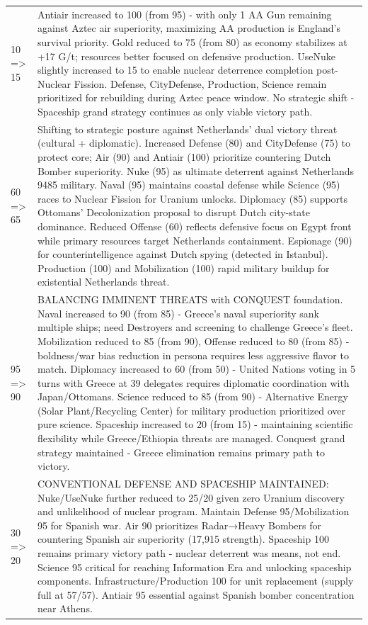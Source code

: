 \begin{longtable}{p{}p{}}
10 => 15 & Antiair increased to 100 (from 95) - with only 1 AA Gun remaining against Aztec air superiority, maximizing AA production is England's survival priority. Gold reduced to 75 (from 80) as economy stabilizes at +17 G/t; resources better focused on defensive production. UseNuke slightly increased to 15 to enable nuclear deterrence completion post-Nuclear Fission. Defense, CityDefense, Production, Science remain prioritized for rebuilding during Aztec peace window. No strategic shift - Spaceship grand strategy continues as only viable victory path. \\
60 => 65 & Shifting to strategic posture against Netherlands' dual victory threat (cultural + diplomatic). Increased Defense (80) and CityDefense (75) to protect core; Air (90) and Antiair (100) prioritize countering Dutch Bomber superiority. Nuke (95) as ultimate deterrent against Netherlands 9485 military. Naval (95) maintains coastal defense while Science (95) races to Nuclear Fission for Uranium unlocks. Diplomacy (85) supports Ottomans' Decolonization proposal to disrupt Dutch city-state dominance. Reduced Offense (60) reflects defensive focus on Egypt front while primary resources target Netherlands containment. Espionage (90) for counterintelligence against Dutch spying (detected in Istanbul). Production (100) and Mobilization (100) rapid military buildup for existential Netherlands threat. \\
95 => 90 & BALANCING IMMINENT THREATS with CONQUEST foundation. Naval increased to 90 (from 85) - Greece's naval superiority sank multiple ships; need Destroyers and screening to challenge Greece's fleet. Mobilization reduced to 85 (from 90), Offense reduced to 80 (from 85) - boldness/war bias reduction in persona requires less aggressive flavor to match. Diplomacy increased to 60 (from 50) - United Nations voting in 5 turns with Greece at 39 delegates requires diplomatic coordination with Japan/Ottomans. Science reduced to 85 (from 90) - Alternative Energy (Solar Plant/Recycling Center) for military production prioritized over pure science. Spaceship increased to 20 (from 15) - maintaining scientific flexibility while Greece/Ethiopia threats are managed. Conquest grand strategy maintained - Greece elimination remains primary path to victory. \\
30 => 20 & CONVENTIONAL DEFENSE AND SPACESHIP MAINTAINED: Nuke/UseNuke further reduced to 25/20 given zero Uranium discovery and unlikelihood of nuclear program. Maintain Defense 95/Mobilization 95 for Spanish war. Air 90 prioritizes Radar→Heavy Bombers for countering Spanish air superiority (17,915 strength). Spaceship 100 remains primary victory path - nuclear deterrent was means, not end. Science 95 critical for reaching Information Era and unlocking spaceship components. Infrastructure/Production 100 for unit replacement (supply full at 57/57). Antiair 95 essential against Spanish bomber concentration near Athens. \\

\end{longtable}

